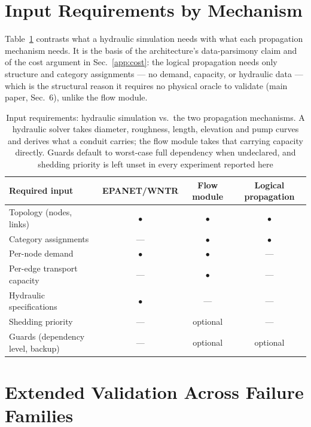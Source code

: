 \documentclass[11pt]{article}
\begin{document}
\section{Input Requirements by Mechanism}\label{app:inputs}

Table~\ref{tab:inputs} contrasts what a hydraulic simulation needs with what each
propagation mechanism needs. It is the basis of the architecture's data-parsimony
claim and of the cost argument in Sec.~\ref{app:cost}: the logical propagation needs
only structure and category assignments --- no demand, capacity, or hydraulic data
--- which is the structural reason it requires no physical oracle to validate
(main paper, Sec.~6), unlike the flow module.

\begin{table}[h]
\centering
\caption{Input requirements: hydraulic simulation vs.\ the two propagation
mechanisms. A hydraulic solver takes diameter, roughness, length, elevation and pump
curves and derives what a conduit carries; the flow module takes that carrying capacity
directly. Guards default to worst-case full dependency when undeclared, and shedding
priority is left unset in every experiment reported here}\label{tab:inputs}
\small
\begin{tabular}{@{}lccc@{}}
\toprule
Required input & EPANET/WNTR & Flow module & Logical propagation\\
\midrule
Topology (nodes, links) & \(\bullet\) & \(\bullet\) & \(\bullet\)\\
Category assignments & --- & \(\bullet\) & \(\bullet\)\\
Per-node demand & \(\bullet\) & \(\bullet\) & ---\\
Per-edge transport capacity & --- & \(\bullet\) & ---\\
Hydraulic specifications & \(\bullet\) & --- & ---\\
Shedding priority & --- & optional & ---\\
Guards (dependency level, backup) & --- & optional & optional\\
\bottomrule
\end{tabular}
\end{table}

\section{Extended Validation Across Failure Families}\label{app:extended}
\end{document}
